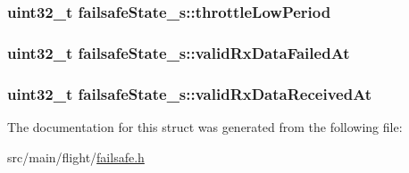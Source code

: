 \hypertarget{structfailsafeState__s_adbb25522041f5e8eea5eba736af1e79e}{
\subsubsection[{throttle\+Low\+Period}]{\setlength{\rightskip}{0pt plus 5cm}uint32\+\_\+t failsafe\+State\+\_\+s\+::throttle\+Low\+Period}}\label{structfailsafeState__s_adbb25522041f5e8eea5eba736af1e79e}
\hypertarget{structfailsafeState__s_a484969c4ef0b0c3543719a29c51ad347}{
\subsubsection[{valid\+Rx\+Data\+Failed\+At}]{\setlength{\rightskip}{0pt plus 5cm}uint32\+\_\+t failsafe\+State\+\_\+s\+::valid\+Rx\+Data\+Failed\+At}}\label{structfailsafeState__s_a484969c4ef0b0c3543719a29c51ad347}
\hypertarget{structfailsafeState__s_a08ccc134339909eb07ffd5b4668084f1}{
\subsubsection[{valid\+Rx\+Data\+Received\+At}]{\setlength{\rightskip}{0pt plus 5cm}uint32\+\_\+t failsafe\+State\+\_\+s\+::valid\+Rx\+Data\+Received\+At}}\label{structfailsafeState__s_a08ccc134339909eb07ffd5b4668084f1}


The documentation for this struct was generated from the following file\+:\begin{DoxyCompactItemize}
\item 
src/main/flight/\hyperlink{flight_2failsafe_8h}{failsafe.\+h}\end{DoxyCompactItemize}
